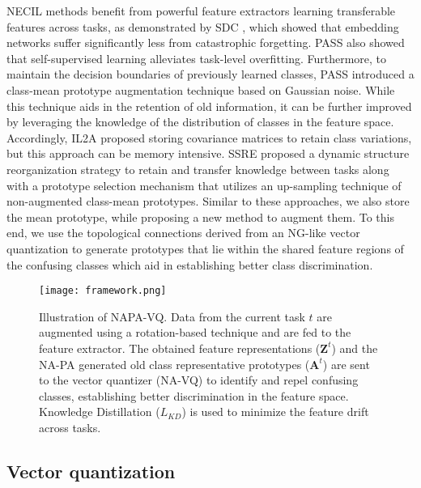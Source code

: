 \documentclass[10pt,twocolumn,letterpaper]{article}
\begin{document}
NECIL methods benefit from powerful feature extractors learning transferable features across tasks, as demonstrated by SDC \cite{Yu2020}, which showed that embedding networks suffer significantly less from catastrophic forgetting. PASS \cite{Zhu2021PrototypeLearning} also showed that self-supervised learning alleviates task-level overfitting. Furthermore, to maintain the decision boundaries of previously learned classes, PASS introduced a class-mean prototype augmentation technique based on Gaussian noise. While this technique aids in the retention of old information, it can be further improved by leveraging the knowledge of the distribution of classes in the feature space. Accordingly, IL2A \cite{Zhu2021Class-IncrementalAugmentation} proposed storing covariance matrices to retain class variations, but this approach can be memory intensive. SSRE \cite{Zhu2022Self-SustainingLearning} proposed a dynamic structure reorganization strategy to retain and transfer knowledge between tasks along with a prototype selection mechanism that utilizes an up-sampling technique of non-augmented class-mean prototypes. Similar to these approaches, we also store the mean prototype, while proposing a new method to augment them. To this end, we use the topological connections derived from an NG-like vector quantization to generate prototypes that lie within the shared feature regions of the confusing classes which aid in establishing better class discrimination.











\begin{figure*}[t]
\centering
\texttt{[image: 
framework.png]}
\caption{Illustration of NAPA-VQ. Data from the current task $t$ are augmented using a rotation-based technique \cite{Zhu2021PrototypeLearning} and are fed to the feature extractor.
The obtained feature representations ($\mathbf{Z}^t$) and the NA-PA generated old class representative prototypes ($\mathbf{A}^t$) are sent to the vector quantizer (NA-VQ) to identify and repel confusing classes, establishing better discrimination in the feature space. 
Knowledge Distillation ($L_{KD}$) is used to minimize the feature drift across tasks.}\label{fig:framework}
\end{figure*} 

\subsection{Vector quantization}
\end{document}

